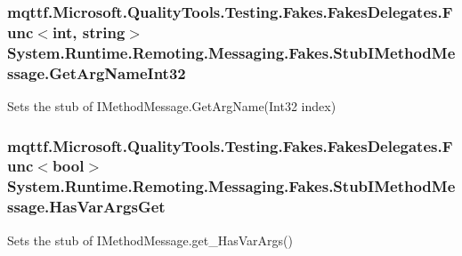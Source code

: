 \hypertarget{class_system_1_1_runtime_1_1_remoting_1_1_messaging_1_1_fakes_1_1_stub_i_method_message_a946a7ef91e0a97b88cc9e12cc0a2deca}{
\subsubsection[{Get\-Arg\-Name\-Int32}]{\setlength{\rightskip}{0pt plus 5cm}mqttf.\-Microsoft.\-Quality\-Tools.\-Testing.\-Fakes.\-Fakes\-Delegates.\-Func$<$int, string$>$ System.\-Runtime.\-Remoting.\-Messaging.\-Fakes.\-Stub\-I\-Method\-Message.\-Get\-Arg\-Name\-Int32}}\label{class_system_1_1_runtime_1_1_remoting_1_1_messaging_1_1_fakes_1_1_stub_i_method_message_a946a7ef91e0a97b88cc9e12cc0a2deca}


Sets the stub of I\-Method\-Message.\-Get\-Arg\-Name(\-Int32 index)

\hypertarget{class_system_1_1_runtime_1_1_remoting_1_1_messaging_1_1_fakes_1_1_stub_i_method_message_a92fa9c6dfaabd1ac1efa3a57a1bc125f}{
\subsubsection[{Has\-Var\-Args\-Get}]{\setlength{\rightskip}{0pt plus 5cm}mqttf.\-Microsoft.\-Quality\-Tools.\-Testing.\-Fakes.\-Fakes\-Delegates.\-Func$<$bool$>$ System.\-Runtime.\-Remoting.\-Messaging.\-Fakes.\-Stub\-I\-Method\-Message.\-Has\-Var\-Args\-Get}}\label{class_system_1_1_runtime_1_1_remoting_1_1_messaging_1_1_fakes_1_1_stub_i_method_message_a92fa9c6dfaabd1ac1efa3a57a1bc125f}


Sets the stub of I\-Method\-Message.\-get\-\_\-\-Has\-Var\-Args()

